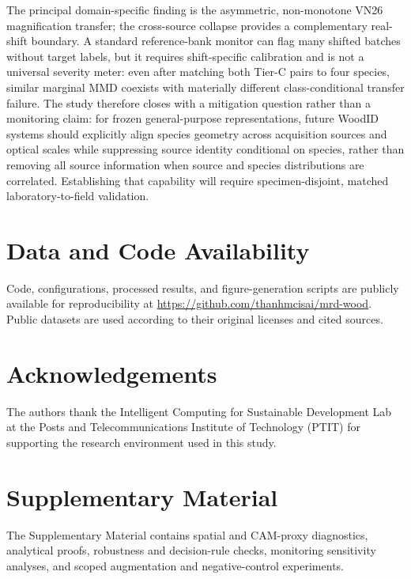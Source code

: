 \documentclass[a4paper,fleqn]{els-cas-templates/cas-sc}
\begin{document}
The principal domain-specific finding is the asymmetric, non-monotone VN26
magnification transfer; the cross-source collapse provides a complementary
real-shift boundary. A standard reference-bank monitor can flag many shifted
batches without target labels, but it requires shift-specific calibration and
is not a universal severity meter: even after matching both Tier-C pairs to four
species, similar marginal MMD coexists with materially different
class-conditional transfer failure. The study
therefore closes with a mitigation question rather than a monitoring claim:
for frozen general-purpose representations, future WoodID systems should explicitly align species geometry across
acquisition sources and optical scales while suppressing source identity
conditional on species, rather than removing all source information when source
and species distributions are correlated.
Establishing that capability will require specimen-disjoint, matched
laboratory-to-field validation.

\section*{Data and Code Availability}

Code, configurations, processed results, and figure-generation scripts are publicly available for reproducibility at \url{https://github.com/thanhmcisai/mrd-wood}. Public datasets are used according to their original licenses and cited sources.

\section*{Acknowledgements}

The authors thank the Intelligent Computing for Sustainable Development Lab at the Posts and Telecommunications Institute of Technology (PTIT) for supporting the research environment used in this study.

\clearpage




\clearpage
\appendix
\section*{Supplementary Material}

The Supplementary Material contains spatial and CAM-proxy diagnostics,
analytical proofs, robustness and decision-rule checks, monitoring sensitivity
analyses, and scoped augmentation and negative-control experiments.
\end{document}
